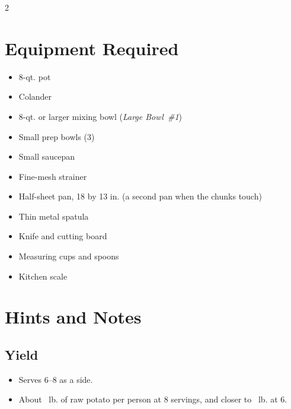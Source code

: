 \documentclass[11pt,letterpaper]{article}
\begin{document}
{\footnotesize
\setlength{\columnsep}{20pt}
\setlength{\multicolsep}{6pt}
\begin{multicols}{2}
\setlength{\parindent}{0pt}
\setlength{\parskip}{2pt}
\setlength{\itemsep}{0pt}
\setlength{\parsep}{0pt}

\section*{Equipment Required}
\begin{itemize}
    \item 8-qt. pot
    \item Colander
    \item 8-qt. or larger mixing bowl (\textit{Large Bowl~\#1})
    \item Small prep bowls (3)
    \item Small saucepan
    \item Fine-mesh strainer
    \item Half-sheet pan, 18 by 13 in. (a second pan when the chunks touch)
    \item Thin metal spatula
    \item Knife and cutting board
    \item Measuring cups and spoons
    \item Kitchen scale
\end{itemize}

\section*{Hints and Notes}

\subsection*{Yield}
\begin{itemize}
    \item Serves 6--8 as a side.
    \item About ~lb. of raw potato per person at 8 servings, and closer to ~lb. at 6.
\end{itemize}


\end{multicols}}
\end{document}
